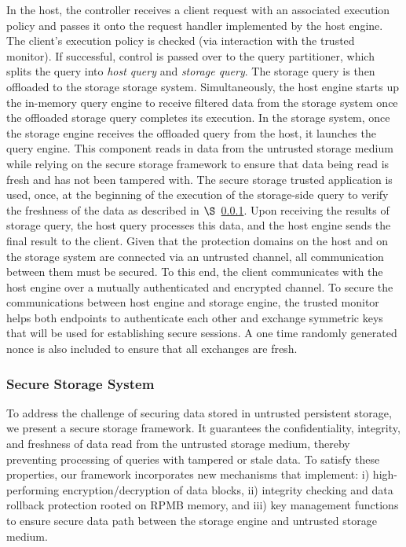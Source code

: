  In the host, the controller receives a client request with an associated execution policy and passes it onto the request handler implemented by the host engine. The client's execution policy is checked (via interaction with the trusted monitor). If successful, control is passed over to the query partitioner, which splits the query into \textit{host query} and \textit{storage query}. The storage query is then offloaded to the storage storage system. Simultaneously, the host engine starts up the in-memory query engine to receive filtered data from the storage system once the offloaded storage query completes its execution. In the storage system, once the storage engine receives the offloaded query from the host, it launches the query engine. This component reads in data from the untrusted storage medium while relying on the secure storage framework to ensure that data being read is fresh and has not been tampered with. The secure storage trusted application is used, once, at the beginning of the execution of the storage-side query to verify the freshness of the data as described in $\S$~\ref{subsec:design-storage}. Upon receiving the results of storage query, the host query processes this data, and the host engine sends the final result to the client. Given that the protection domains on the host and on the storage system are connected via an untrusted channel, all communication between them must be secured. To this end, the client communicates with the host engine over a mutually authenticated and encrypted channel. To secure the communications between host engine and storage engine, the trusted monitor helps both endpoints to authenticate each other and exchange symmetric keys that will be used for establishing secure sessions. A one time randomly generated nonce is also included to ensure that all exchanges are fresh.
\fi

\subsubsection{Secure Storage System}
\label{subsec:design-storage}

To address the challenge of securing data stored in untrusted persistent storage, we present a secure storage framework. It guarantees the confidentiality, integrity, and freshness of data read from the untrusted storage medium, thereby preventing processing of queries with tampered or stale data. To satisfy these properties, our framework incorporates new mechanisms that implement: i) high-performing encryption/decryption of data blocks, ii) integrity checking and data rollback protection rooted on RPMB memory, and iii) key management functions to ensure secure data path between the storage engine and untrusted storage medium. 

